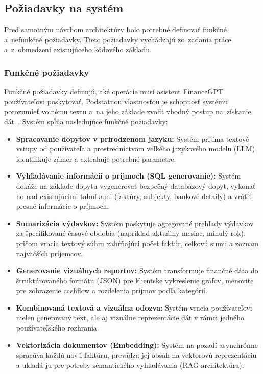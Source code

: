 \subsection{Požiadavky na systém}
Pred samotným návrhom architektúry bolo potrebné definovať funkčné a~nefunkčné
požiadavky. Tieto požiadavky vychádzajú zo~zadania práce a~z~obmedzení existujúceho
kódového základu.

\subsubsection{Funkčné požiadavky}
Funkčné požiadavky definujú, aké operácie musí asistent FinanceGPT používateľovi
poskytovať. Podstatnou vlastnosťou je schopnosť systému porozumieť voľnému textu a~na
jeho základe zvoliť vhodný postup na~získanie dát~\cite{atkinson2025}. Systém
spĺňa nasledujúce funkčné požiadavky:

\begin{itemize}
	\item \textbf{Spracovanie dopytov v prirodzenom jazyku:} Systém prijíma
		textové vstupy od používateľa a prostredníctvom veľkého jazykového modelu (LLM)
		identifikuje zámer a extrahuje potrebné parametre.

	\item \textbf{Vyhľadávanie informácií o príjmoch (SQL generovanie):} Systém
		dokáže na základe dopytu vygenerovať bezpečný databázový dopyt, vykonať ho nad
		existujúcimi tabuľkami (faktúry, subjekty, bankové detaily) a vrátiť presné informácie
		o príjmoch.

	\item \textbf{Sumarizácia výdavkov:} Systém poskytuje agregované prehľady
		výdavkov za špecifikované časové obdobia (napríklad aktuálny mesiac, minulý
		rok), pričom vracia textový súhrn zahŕňajúci počet faktúr, celkovú sumu a zoznam
		najväčších príjemcov.

	\item \textbf{Generovanie vizuálnych reportov:} Systém transformuje finančné
		dáta do štruktúrovaného formátu (JSON) pre klientske vykreslenie grafov, menovite
		pre zobrazenie cashflow a rozdelenia príjmov podľa kategórií.

	\item \textbf{Kombinovaná textová a vizuálna odozva:} Systém vracia
		používateľovi nielen generovaný text, ale aj vizuálne reprezentácie dát v rámci
		jedného používateľského rozhrania.

	\item \textbf{Vektorizácia dokumentov (Embedding):} Systém na pozadí
		asynchrónne spracúva každú novú faktúru, prevádza jej obsah na vektorovú reprezentáciu
		a ukladá ju pre potreby sémantického vyhľadávania (RAG architektúra).
\end{itemize}

